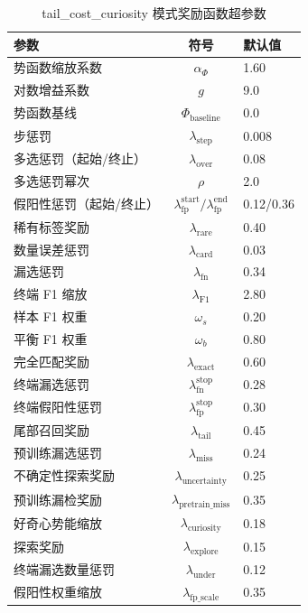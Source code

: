 \documentclass[12pt,a4paper]{article}
\begin{document}
\begin{table}[H]
\centering
\caption{tail\_cost\_curiosity 模式奖励函数超参数}
\begin{tabular}{lcl}
\toprule
\textbf{参数} & \textbf{符号} & \textbf{默认值} \\
\midrule
势函数缩放系数 & $\alpha_{\Phi}$ & 1.60 \\
对数增益系数 & $g$ & 9.0 \\
势函数基线 & $\Phi_{\text{baseline}}$ & 0.0 \\
步惩罚 & $\lambda_{\text{step}}$ & 0.008 \\
多选惩罚（起始/终止） & $\lambda_{\text{over}}$ & 0.08 \\
多选惩罚幂次 & $\rho$ & 2.0 \\
假阳性惩罚（起始/终止） & $\lambda_{\text{fp}}^{\text{start}}/\lambda_{\text{fp}}^{\text{end}}$ & 0.12/0.36 \\
稀有标签奖励 & $\lambda_{\text{rare}}$ & 0.40 \\
数量误差惩罚 & $\lambda_{\text{card}}$ & 0.03 \\
漏选惩罚 & $\lambda_{\text{fn}}$ & 0.34 \\
终端 F1 缩放 & $\lambda_{\text{F1}}$ & 2.80 \\
样本 F1 权重 & $\omega_s$ & 0.20 \\
平衡 F1 权重 & $\omega_b$ & 0.80 \\
完全匹配奖励 & $\lambda_{\text{exact}}$ & 0.60 \\
终端漏选惩罚 & $\lambda_{\text{fn}}^{\text{stop}}$ & 0.28 \\
终端假阳性惩罚 & $\lambda_{\text{fp}}^{\text{stop}}$ & 0.30 \\
尾部召回奖励 & $\lambda_{\text{tail}}$ & 0.45 \\
预训练漏选惩罚 & $\lambda_{\text{miss}}$ & 0.24 \\
不确定性探索奖励 & $\lambda_{\text{uncertainty}}$ & 0.25 \\
预训练漏检奖励 & $\lambda_{\text{pretrain\_miss}}$ & 0.35 \\
好奇心势能缩放 & $\lambda_{\text{curiosity}}$ & 0.18 \\
探索奖励 & $\lambda_{\text{explore}}$ & 0.15 \\
终端漏选数量惩罚 & $\lambda_{\text{under}}$ & 0.12 \\
假阳性权重缩放 & $\lambda_{\text{fp\_scale}}$ & 0.35 \\
\bottomrule
\end{tabular}
\end{table}
\end{document}
